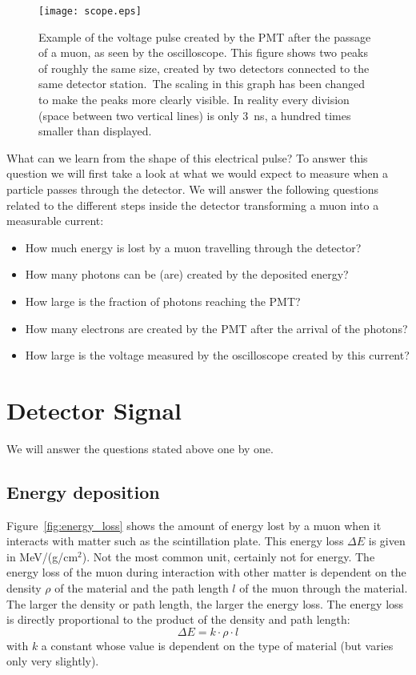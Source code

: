 \begin{figure}\begin{center}
\texttt{[image: scope.eps]}%
\caption{Example of the voltage pulse created by the PMT after the passage of a muon, as seen by the oscilloscope. This figure shows two peaks of roughly the same size, created by two detectors connected to the same detector station.\protect\footnotemark ~The scaling in this graph has been changed to make the peaks more clearly visible. In reality every division (space between two vertical lines) is only 3~ns, a hundred times smaller than displayed.}\label{fig:scope}
\end{center}\end{figure}

What can we learn from the shape of this electrical pulse? To answer this question we will first take a look at what we would expect to measure when a particle passes through the detector. We will answer the following questions related to the different steps inside the detector transforming a muon into a measurable current:
\begin{itemize}
\item How much energy is lost by a muon travelling through the detector?
\item How many photons can be (are) created by the deposited energy?
\item How large is the fraction of photons reaching the PMT?
\item How many electrons are created by the PMT after the arrival of the photons?
\item How large is the voltage measured by the oscilloscope created by this current?
\end{itemize}

\section{Detector Signal}
We will answer the questions stated above one by one.
\subsection{Energy deposition}
Figure~\ref{fig:energy_loss} shows the amount of energy lost by a muon when it interacts with matter such as the scintillation plate. This energy loss $\Delta E$ is given in MeV/(g/cm$^2$). Not the most common unit, certainly not for energy. The energy loss of the muon during interaction with other matter is dependent on the density $\rho$ of the material and the path length $l$ of the muon through the material. The larger the density or path length, the larger the energy loss. The energy loss is directly proportional to the product of the density and path length:
\begin{equation}
\Delta E = k \cdot \rho \cdot l
\end{equation}
with $k$ a constant whose value is dependent on the type of material (but varies only very slightly).

